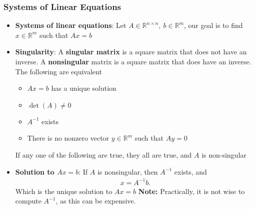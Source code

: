 \documentclass{report}
\begin{document}
    \pagebreak 
    \subsubsection{Systems of Linear Equations}
    \begin{itemize}
        \item \textbf{Systems of linear equations}: Let $A \in \mathbb{R}^{n\times n},\ b \in \mathbb{R}^{m}$, our goal is to find $x \in \mathbb{R}^{m}$ such that $Ax = b$
        \item \textbf{Singularity}: A \textbf{singular matrix} is a square matrix that does not have an inverse.
            \bigbreak \noindent 
            A \textbf{nonsingular} matrix is a square matrix that does have an inverse.
            \bigbreak \noindent 
            The following are equivalent
            \begin{itemize}
                \item $Ax = b$ has a unique solution
                \item $\det(A)\ne 0$
                \item $A^{-1}$ exists
                \item There is no nonzero vector $y \in \mathbb{R}^{m}$ such that $Ay=0 $
            \end{itemize}
            If any one of the following are true, they all are true, and $A$ is non-singular
        \item \textbf{Solution to $Ax = b$}: If $A$ is nonsingular, then $A^{-1}$ exists, and
            \begin{align*}
                x = A^{-1}b
            .\end{align*}
            Which is the unique solution to $Ax=b$
            \bigbreak \noindent 
            \textbf{Note:} Practically, it is not wise to compute $A^{-1}$, as this can be expensive.
    \end{itemize}

    \pagebreak 
\end{document}
